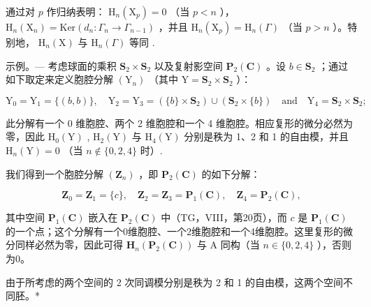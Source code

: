 通过对 \(p\) 作归纳表明： \(\mathrm{H}_{n}(\mathrm{X}_{p})=0\) （当 \(p<n\) ）， \(\mathrm{H}_{n}(\mathrm{X}_{n})=\mathrm{Ker}\left(d_{n}:\Gamma_{n}\to\Gamma_{n-1}\right)\) ，并且 \(\mathrm{H}_{n}(\mathrm{X}_{p})=\mathrm{H}_{n}(\Gamma)\) （当 \(p>n\) ）。特别地， \(\mathrm{H}_{n}(\mathrm{X})\) 与 \(\mathrm{H}_{n}(\Gamma)\) 等同 .

示例。--- 考虑球面的乘积 \(\mathbf{S}_{2} \times \mathbf{S}_{2}\) 以及复射影空间 \(\mathbf{P}_{2}(\mathbf{C})\) 。设 \(b \in \mathbf{S}_{2}\) ；通过如下取定来定义胞腔分解 \((\mathrm{Y}_{n})\) （其中 \(\mathrm{Y} = \mathbf{S}_{2} \times \mathbf{S}_{2}\) ）：

\[
\mathrm{Y} _ {0} = \mathrm{Y} _ {1} = \{(b, b) \}, \quad \mathrm{Y} _ {2} = \mathrm{Y} _ {3} = (\{b \} \times \mathbf {S} _ {2}) \cup (\mathbf {S} _ {2} \times \{b \}) \quad \text {and} \quad \mathrm{Y} _ {4} = \mathbf {S} _ {2} \times \mathbf {S} _ {2};
\]

此分解有一个 0 维胞腔、两个 2 维胞腔和一个 4 维胞腔。相应复形的微分必然为零，因此 \(\mathrm{H}_{0}(\mathrm{Y})\) , \(\mathrm{H}_{2}(\mathrm{Y})\) 与 \(\mathrm{H}_{4}(\mathrm{Y})\) 分别是秩为 1、2 和 1 的自由模，并且 \(\mathrm{H}_{n}(\mathrm{Y}) = 0\) （当 \(n \notin \{0, 2, 4\}\) 时）.

我们得到一个胞腔分解 \((\mathbf{Z}_{n})\) ，即 \(\mathbf{P}_{2}(\mathbf{C})\) 的如下分解：

\[
\mathbf {Z} _ {0} = \mathbf {Z} _ {1} = \{c \}, \quad \mathbf {Z} _ {2} = \mathbf {Z} _ {3} = \mathbf {P} _ {1} (\mathbf {C}), \quad \mathbf {Z} _ {4} = \mathbf {P} _ {2} (\mathbf {C}),
\]

其中空间 \(\mathbf{P}_{1}(\mathbf{C})\) 嵌入在 \(\mathbf{P}_{2}(\mathbf{C})\) 中（TG，VIII，第20页），而 \(c\) 是 \(\mathbf{P}_{1}(\mathbf{C})\) 的一个点；这个分解有一个0维胞腔、一个2维胞腔和一个4维胞腔。这里复形的微分同样必然为零，因此可得 \(\mathbf{H}_{n}(\mathbf{P}_{2}(\mathbf{C}))\) 与 A 同构（当 \(n \in \{0, 2, 4\}\) ），否则为0。

由于所考虑的两个空间的 2 次同调模分别是秩为 2 和 1 的自由模，这两个空间不同胚。*

